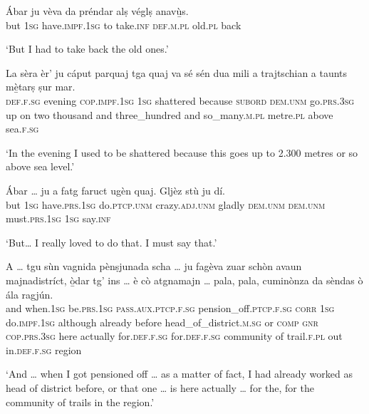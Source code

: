 \begin{linenumbers}
\gll Ábar ju vèva da préndar alṣ véglṣ anavù̱s.\footnotemark{}   \\
but \textsc{1sg} have.\textsc{impf.1sg} to take.\textsc{inf} \textsc{def.m.pl} old.\textsc{pl} back \\
\end{linenumbers}
\medskip
\glt `But I had to take back the old ones.'
\medskip

\begin{linenumbers}
\gll  La sèra èr’ ju cáput parquaj tga quaj va sé sén dua mili a trajtschian a taunts mè̱tarṣ ṣur mar. \\
 \textsc{def.f.sg} evening \textsc{cop.impf.1sg} \textsc{1sg} shattered because \textsc{subord} \textsc{dem.unm} go.\textsc{prs.3sg} up on two thousand and three\_hundred and  so\_many.\textsc{m.pl} metre.\textsc{pl} above sea.\textsc{f.sg}\\
\end{linenumbers}
\medskip
\glt `In the evening I used to be shattered because this goes up to 2.300 metres or so above sea level.'
\medskip

\begin{linenumbers}
\gll  Ábar … ju a fatg faruct ugèn quaj. Gljèz stù ju dí.  \\
but {} \textsc{1sg} have.\textsc{prs.1sg} do.\textsc{ptcp.unm} crazy.\textsc{adj.unm} gladly \textsc{dem.unm} \textsc{dem.unm} must.\textsc{prs.1sg} \textsc{1sg} say.\textsc{inf}\\ 
\end{linenumbers}
\medskip
\glt `But… I really loved to do that. I must say that.'
\medskip

\begin{linenumbers}
\gll  A … tgu sùn vagnida pènṣjunada scha … ju fagèva zuar schòn avaun majnadistríct, ò̱dar tg’ ins … è cò atgnamajn … pala, pala, cuminònza da sèndas ò ála ragjún.  \\
and {} when.\textsc{1sg} be.\textsc{prs.1sg} \textsc{pass.aux.ptcp.f.sg} pension\_off.\textsc{ptcp.f.sg} \textsc{corr} {} \textsc{1sg} do.\textsc{impf.1sg} although already before head\_of\_district.\textsc{m.sg} or \textsc{comp} \textsc{gnr} {} \textsc{cop.prs.3sg} here actually {} for.\textsc{def.f.sg} for.\textsc{def.f.sg} community of trail.\textsc{f.pl} out in.\textsc{def.f.sg} region\\
\end{linenumbers}
\medskip
\glt `And … when I got pensioned off … as a matter of fact, I had already worked as head of district before, or that one … is here actually … for the, for the community of trails in the region.'
\medskip
 
